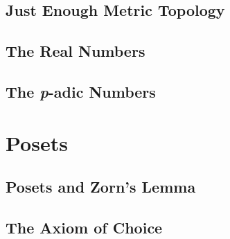 \documentclass{memoir}
\begin{document}
    \section{Just Enough Metric Topology}
      \label{sec:ring-with-abs-val}
      
      \newpage

    \section{The Real Numbers}
      \label{sec:reals}
      
      \newpage

    \section{The \emph{p}-adic Numbers}

  \chapter{Posets}
    \newpage

    \section{Posets and Zorn's Lemma}
      \label{sec:zorn}
      
      \newpage

    \section{The Axiom of Choice}


\backmatter
  \printindex
\end{document}

